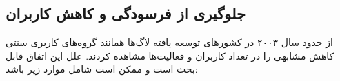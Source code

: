 \subsection{جلوگیری از فرسودگی و کاهش کاربران}

از حدود سال ۲۰۰۳ در کشورهای توسعه یافته لاگ‌ها همانند گروه‌های کاربری سنتی
کاهش مشابهی را در تعداد کاربران و فعالیت‌ها مشاهده کردند. علل این اتفاق قابل بحث است
و ممکن است شامل موارد زیر باشد:


